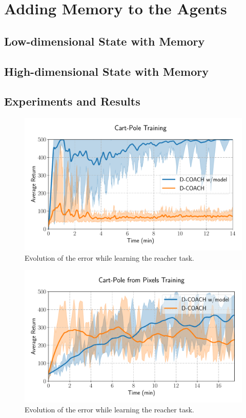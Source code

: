 \chapter{Adding Memory to the Agents}

\section{Low-dimensional State with Memory}
\section{High-dimensional State with Memory}

\section{Experiments and Results}

\begin{figure}[t]
    \centering
    \includegraphics[width=0.9\linewidth]{imagenes/cap3/cartpole_LD_model.pdf}
    \caption{Evolution of the error while learning the reacher task. }
    \label{fig:reacher_exp}
\end{figure}

\begin{figure}[t]
    \centering
    \includegraphics[width=0.9\linewidth]{imagenes/cap3/cartpole_HD_model.pdf}
    \caption{Evolution of the error while learning the reacher task. }
    \label{fig:reacher_exp}
\end{figure}


